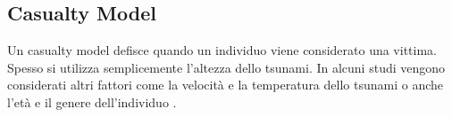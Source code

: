 \subsection{Casualty Model}
Un casualty model defisce quando un individuo viene considerato una vittima.
Spesso si utilizza semplicemente l'altezza dello tsunami.
In alcuni studi vengono considerati altri fattori come la velocità
e la temperatura dello tsunami o anche l'età e il genere dell'individuo \parencite{yeh2010gender}.

